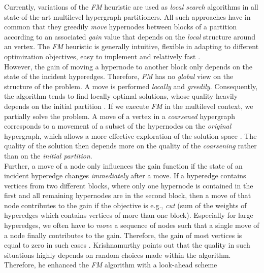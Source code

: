 Currently, variations of the \emph{FM} heuristic \cite{fiduccia1988linear} are used 
as \emph{local search} algorithms in all state-of-the-art multilevel hypergraph partitioners.  
All such approaches have in common that they greedily \emph{move} hypernodes 
between blocks of a partition according to an associated \emph{gain} value that 
depends on the \emph{local} structure around an vertex. The \emph{FM} heuristic is generally
intuitive, flexible in adapting to different optimization objectives, easy to implement and
relatively fast \cite{zhao2002effective}. \\
However, the gain of moving a hypernode to another block only depends on the state of the
incident hyperedges. Therefore, \emph{FM} has no \emph{global} view on the structure
of the problem. A move is performed \emph{locally} and \emph{greedily}.
Consequently, the algorithm tends to find locally optimal solutions, whose quality heavily depends
on the initial partition \cite{dutt1997vlsi}. 
If we execute \emph{FM} in the multilevel context, we partially solve the problem.
A move of a vertex in a \emph{coarsened} hypergraph corresponds to a movement
of a subset of the hypernodes on the \emph{original} hypergraph, which allows a more 
effective exploration of the solution space \cite{papa2007hypergraph}. The quality of
the solution then depends more on the quality of the \emph{coarsening} rather than
on the \emph{initial partition}.\\
Further, a move of a node only influences the gain function if the state of an incident hyperedge
changes \emph{immediately} after a move. If a hyperedge contains vertices from two different blocks,
where only one hypernode is contained in the first and all remaining hypernodes are in the second block,
then a move of that node contributes to the gain if the objective is e.g., \emph{cut} 
(sum of the weights of hyperedges which contains vertices of more than one block). 
Especially for large hyperedges, we often have to \emph{move} a sequence of nodes
such that a single move of a node finally contributes to the gain.
Therefore, the gain of most vertices is equal to zero in such cases \cite{mann2014formula}. 
Krishnamurthy \cite{krishnamurthy1984improved} points out that the quality 
in such situations highly depends on random choices made within
the algorithm. Therefore, he enhanced the \emph{FM} algorithm with a look-ahead scheme
